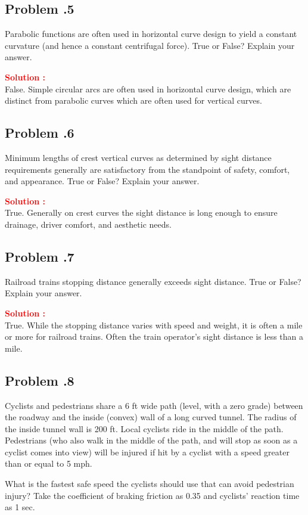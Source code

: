 \documentclass[12pt]{article}
\newcommand{\customsubsection}[1]{
  \subsection*{Problem \thesection.#1}
}
\begin{document}
\customsubsection{5}
Parabolic functions are often used in horizontal curve design to yield a constant curvature (and hence a constant centrifugal force). True or False? Explain your answer. 


\textbf{\textcolor{red}{Solution :}} \\
False. Simple circular arcs are often used in horizontal curve design, which are distinct from parabolic curves which are often used for vertical curves.
\newpage


\customsubsection{6}
Minimum lengths of crest vertical curves as determined by sight distance requirements generally are satisfactory from the standpoint of safety, comfort, and appearance. True or False? Explain your answer. 


\textbf{\textcolor{red}{Solution :}} \\
True. Generally on crest curves the sight distance is long enough to ensure drainage, driver comfort, and aesthetic needs.
\newpage


\customsubsection{7}
Railroad trains stopping distance generally exceeds sight distance. True or False? Explain your answer. 


\textbf{\textcolor{red}{Solution :}} \\
True. While the stopping distance varies with speed and weight, it is often a mile or more for railroad trains. Often the train operator's sight distance is less than a mile.

\newpage

\customsubsection{8}
Cyclists and pedestrians share a 6 ft wide path (level, with a zero grade) between the roadway and the inside (convex) wall of a long curved tunnel. The radius of the inside tunnel wall is 200 ft. Local cyclists ride in the middle of the path. Pedestrians (who also walk in the middle of the path, and will stop as soon as a cyclist comes into view) will be injured if hit by a cyclist with a speed greater than or equal to 5 mph.

What is the fastest safe speed the cyclists should use that can avoid pedestrian injury? Take the coefficient of braking friction as 0.35 and cyclists’ reaction time as 1 sec.
\end{document}
